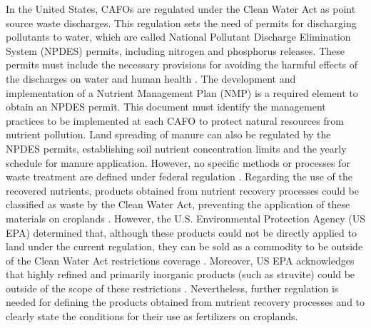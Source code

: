 \begin{refsection}[referencesCh1]
In the United States, CAFOs are regulated under the Clean Water Act as point source waste discharges. This regulation sets the need of permits for discharging pollutants to water, which are called National Pollutant Discharge Elimination System (NPDES) permits, including nitrogen and phosphorus releases. These permits must include the necessary provisions for avoiding the harmful effects of the discharges on water and human health \citep{NPDE_basics}. The development and implementation of a Nutrient Management Plan (NMP) is a required element to obtain an NPDES permit. This document must identify the management practices to be implemented at each CAFO to protect natural resources from nutrient pollution. Land spreading of manure can also be regulated by the NPDES permits, establishing soil nutrient concentration limits and the yearly schedule for manure application. However, no specific methods or processes for waste treatment are defined under federal regulation \citep{NPDESforCAFO}. Regarding the use of the recovered nutrients, products obtained from nutrient recovery processes could be classified as waste by the Clean Water Act, preventing the application of these materials on croplands \citep{NACWA503}. However, the U.S. Environmental Protection Agency (US EPA) determined that, although these products could not be directly applied to land under the current regulation, they can be sold as a commodity to be outside of the Clean Water Act restrictions coverage \citep{CNP503}. Moreover, US EPA acknowledges that highly refined and primarily inorganic products (such as struvite) could be outside of the scope of these restrictions \citep{CNP503}. Nevertheless, further regulation is needed for defining the products obtained from nutrient recovery processes and to clearly state the conditions for their use as fertilizers on croplands.



\end{refsection}
